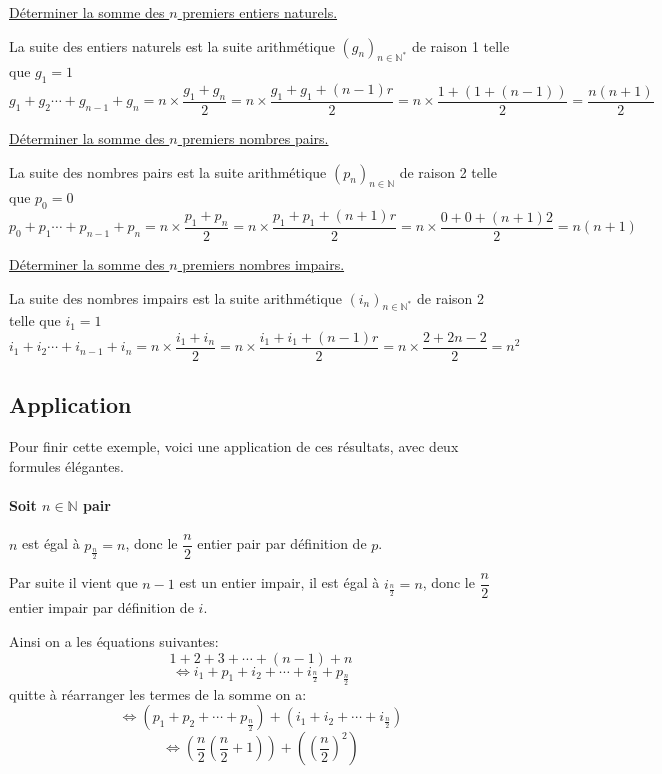 \documentclass[french]{book}
\newcommand{\N}{\mathbb {N}}
\newcommand{\suite}[1][u]{\left( #1_{n} \right)_{n\in\N}}
\newcommand{\suitep}[1][u]{\left( #1_{n} \right)_{n\in\N^{*}}}
\begin{document}
\begin{exemple}
\underline{Déterminer la somme des $n$ premiers entiers naturels.}

La suite des entiers naturels est la suite arithmétique $\suitep[g]$ de raison 1 telle que $g_1=1$
\begin{equation*}
g_{1}+g_2 \cdots + g_{n-1}+g_{n}=n\times \dfrac{g_{1}+g_{n}}{2}=n\times \dfrac{g_{1}+g_{1}+(n-1)r}{2}=n\times\dfrac{1+(1+(n-1))}{2}=\dfrac{n(n+1)}{2}
\end{equation*}

\underline{Déterminer la somme des $n$ premiers nombres pairs.}

La suite des nombres pairs est la suite arithmétique $\suite[p]$ de raison 2 telle que $p_0=0$
\begin{equation*}
p_{0}+p_1 \cdots + p_{n-1}+p_{n}=n\times \dfrac{p_{1}+p_{n}}{2}=n\times \dfrac{p_{1}+p_{1}+(n+1)r}{2}=n\times\dfrac{0+0+(n+1)2}{2}=n(n+1)
\end{equation*}


\underline{Déterminer la somme des $n$ premiers nombres impairs.}

La suite des nombres impairs est la suite arithmétique $\suitep[i]$ de raison 2 telle que $i_1=1$
\begin{equation*}
i_{1}+i_2 \cdots + i_{n-1}+i_{n}=n\times \dfrac{i_{1}+i_{n}}{2}=n\times \dfrac{i_{1}+i_{1}+(n-1)r}{2}=n\times\dfrac{2+2n-2}{2}=n^2
\end{equation*}
\end{exemple}

\newpage

\subsection*{Application}
Pour finir cette exemple, voici une application de ces résultats, avec deux formules élégantes. 

 \paragraph*{Soit $n \in \N$ pair}
 
$n$ est égal à $p_{\frac{n}{2}}=n$, donc le  $\dfrac{n}{2}$ entier pair par définition de $p$.
\par Par suite il vient que $n-1$ est un entier impair, il est égal à $i_{\frac{n}{2}}=n$, donc le  $\dfrac{n}{2}$ entier impair par définition de $i$.

Ainsi on a les équations suivantes:
$$1+2+3+\cdots+(n-1)+n$$
$$\Longleftrightarrow i_1+ p_1+ i_2 + \cdots + i_{\frac{n}{2}} + p_{\frac{n}{2}}$$
quitte à réarranger les termes de la somme on a:
$$\Longleftrightarrow (p_1+p_2+\cdots+p_{\frac{n}{2}}) + (i_1+ i_2 + \cdots + i_{\frac{n}{2}})$$
$$\Longleftrightarrow (\dfrac{n}{2}(\dfrac{n}{2}+1))+ ( (\dfrac{n}{2})^2)$$
\end{document}
